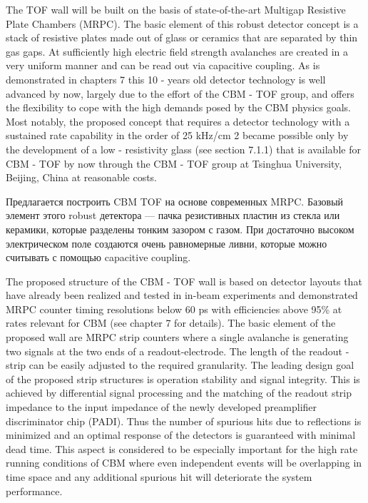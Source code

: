 The TOF wall will be built on the basis of state-of-the-art Multigap Resistive Plate Chambers (MRPC). The basic element of this robust detector concept is a stack of resistive plates made out of glass or ceramics that are separated by thin gas gaps. At sufficiently high electric field strength avalanches are created in a very uniform manner and can be read out via capacitive coupling. As is demonstrated in chapters 7 this 10 - years old detector technology is well advanced by now, largely due to the effort of the CBM - TOF group, and offers the flexibility to cope with the high demands posed by the CBM physics goals. Most notably, the proposed concept that requires a detector technology with a sustained rate capability in the order of 25 kHz/cm 2 became possible only by the development of a low - resistivity glass (see section 7.1.1) that is available for CBM - TOF by now through the CBM - TOF group at Tsinghua University, Beijing, China at reasonable costs.

Предлагается построить CBM TOF на основе современных MRPC. Базовый элемент этого robust детектора --- пачка резистивных пластин из стекла или керамики, которые разделены тонким зазором с газом. При достаточно высоком электрическом поле создаются очень равномерные ливни, которые можно считывать с помощью capacitive coupling.

The proposed structure of the CBM - TOF wall is based on detector layouts that have already been
realized and tested in in-beam experiments and demonstrated MRPC counter timing resolutions below
60 ps with efficiencies above 95\% at rates relevant for CBM (see chapter 7 for details). The basic element
of the proposed wall are MRPC strip counters where a single avalanche is generating two signals at
the two ends of a readout-electrode. The length of the readout - strip can be easily adjusted to the
required granularity. The leading design goal of the proposed strip structures is operation stability and
signal integrity. This is achieved by differential signal processing and the matching of the readout strip
impedance to the input impedance of the newly developed preamplifier discriminator chip (PADI). Thus
the number of spurious hits due to reflections is minimized and an optimal response of the detectors is
guaranteed with minimal dead time. This aspect is considered to be especially important for the high
rate running conditions of CBM where even independent events will be overlapping in time space and
any additional spurious hit will deteriorate the system performance.

